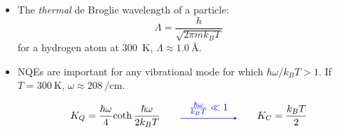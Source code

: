 \begin{frame}
\begin{itemize}
    
    \item The \emph{thermal} de Broglie wavelength of a particle:
    $$
    \Lambda = \frac{h}{\sqrt{2\pi m k_B T}}
    $$
    for a hydrogen atom at \SI{300}{\kelvin}, $\Lambda \approx \SI{1.0}{\angstrom}$.

    \item NQEs are important for any vibrational mode for which 
    $\hbar\omega /k_B T > 1$. If $T = \SI{300}{\kelvin}$, $\omega \approx \SI{208}{\per\cm}$.
    \begin{equation*}
      K_Q = {\hbar\omega\over4}{\coth{\hbar\omega\over2k_BT}}
      \qquad
      \tikz \draw [->, >=stealth, blue, line width=0.5pt] (0, 0) -- node[above,
      midway]{${\hbar\omega\over k_BT} \ll 1$} (2.0, 0.0);
      \qquad
      K_C = {k_B T \over 2}
    \end{equation*}
  \end{itemize}
\end{frame}
